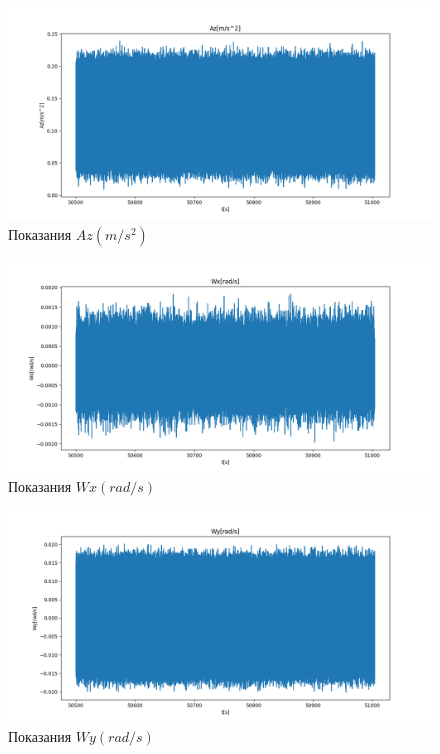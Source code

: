 \documentclass[a4paper,14pt]{article}
\theoremstyle{plain} %
\theoremstyle{definition} %
\theoremstyle{remark} %
\begin{document}
{\begin{figure}[h!]
    \centering
    \includegraphics[width=0.99\linewidth]{Az.png}
    \caption{Показания $Az(m/s^2)$}
    \label{fig:az}
\end{figure}

\begin{figure}[h!]
    \centering
    \includegraphics[width=0.99\linewidth]{Wx.png}
    \caption{Показания $Wx(rad/s)$}
    \label{fig:wx}
\end{figure}

\begin{figure}[h!]
    \centering
    \includegraphics[width=0.99\linewidth]{Wy.png}
    \caption{Показания $Wy(rad/s)$}
    \label{fig:wy}
\end{figure}

}
\end{document}
